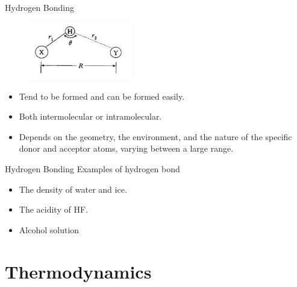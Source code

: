 \documentclass[12pt,compress]{beamer}
\begin{document}
\begin{frame}{Hydrogen Bonding}
	\begin{figure}
		\centering 
		\includegraphics[width=0.4\textwidth]{hydrogen_bond.png}
	\end{figure}
	\begin{itemize}
		\item Tend to be formed and can be formed easily.
		\item Both intermolecular or intramolecular.
		\item Depends on the geometry, the environment, and the nature of the specific donor and acceptor atoms, varying between a large range.
	\end{itemize}
\end{frame}
\begin{frame}{Hydrogen Bonding}
	Examples of hydrogen bond
	\begin{itemize}
		\item The density of water and ice.
		\item The acidity of HF.
		\item Alcohol solution
	\end{itemize}
\end{frame}


\section{Thermodynamics}
\end{document}
